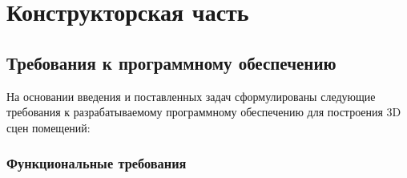 \section{Конструкторская часть}

\subsection{Требования к программному обеспечению}

\hspace{1.25cm}
На основании введения и поставленных задач сформулированы следующие требования к разрабатываемому программному обеспечению для построения 3D сцен помещений:

\subsubsection{Функциональные требования}
